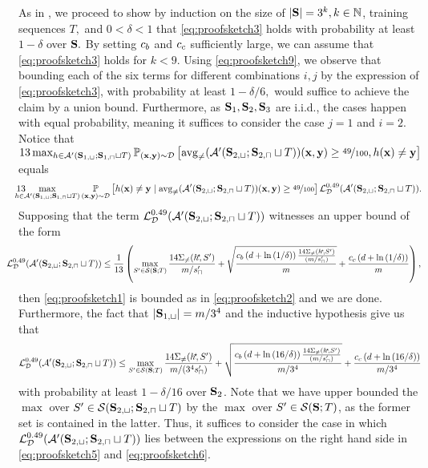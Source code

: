 As in \cite{hanneke2016optimal}, we proceed to show by induction on the size of $|\mathbf{S}|=3^{k}, k\in\mathbb{N} $, training sequences $T, $ and $ 0< \delta<1$ that \cref{eq:proofsketch3} holds with probability at least $ 1-\delta $ over $ \mathbf{S}. $  
By setting $ c_b $ and $ c_c $ sufficiently large, we can assume that \cref{eq:proofsketch3} holds for $k < 9$.
Using \cref{eq:proofsketch9}, we observe that
bounding each of the six terms for different combinations $ i,j $ by the expression of \cref{eq:proofsketch3}, with probability at least $ 1-\delta/6,$ would suffice to achieve the claim by a union bound.
Furthermore, as $ \mathbf{S}_{1},\mathbf{S}_{2},\mathbf{S}_{3} $ are i.i.d., the cases happen with equal probability, meaning it suffices to consider the case $ j=1$ and $ i=2.$ 
Notice that $13\max_{h\in\mathcal{A}'(\mathbf{S}_{1,\sqcup};\mathbf{S}_{1,\sqcap}\sqcup T)} \operatorname*{\mathbb{P}}_{(\mathbf{x},\mathbf{y})\sim\mathcal{D}}\left[\operatorname{\mathrm{avg}_{\not=}}(\mathcal{A}'(\mathbf{S}_{2,\sqcup};\mathbf{S}_{2,\sqcap}\sqcup T))(\mathbf{x},\mathbf{y})\geq \nicefrac{49}{100},h(\mathbf{x})\not=\mathbf{y}\right] $ equals 
\begin{align}\label{eq:proofsketch1}
\hspace{-0.1 cm}
13\negmedspace\negmedspace\negmedspace\negmedspace\negmedspace\negmedspace\max_{h\in\cA'(\rS_{1,\sqcup};\rS_{1,\sqcap}\sqcup T)}\p_{(\rx,\ry)\sim\cD}\left[h(\rx)\not=\ry\mid \avg(\cA'(\rS_{2,\sqcup};\rS_{2,\sqcap}\sqcup T))(\rx,\ry)\geq \nicefrac{49}{100}\right]\ls_{\cD}^{0.49}(\cA'(\rS_{2,\sqcup};\rS_{2,\sqcap}\sqcup T)). 
\end{align} 
Supposing that the term $ \operatorname{\mathcal{L}}_{\mathcal{D}}^{0.49}(\mathcal{A}'(\mathbf{S}_{2,\sqcup};\mathbf{S}_{2,\sqcap}\sqcup T)) $ witnesses an upper bound of the form
\begin{align}\label{eq:proofsketch5}
\hspace{-0.5 cm}
\ls_{\cD}^{0.49}(\cA'(\rS_{2,\sqcup};\rS_{2,\sqcap}\sqcup T)) \leq \frac{1}{13}\left(\max\limits_{S'\in\cS(\rS;T)}\frac{14\Sigma_{\not=}(\hs\negmedspace,S')}{m/s_{\sqcap}'}+\sqrt{\frac{\cb\left(d+\ln{(1/\delta )}\right)\frac{14\Sigma_{\not=}(\hs\negmedspace,S')}{(m/s_{\sqcap}')}}{m}}+\frac{\cc\left(d+\ln{(1/\delta )}\right)}{m}\right),
\end{align}
then \cref{eq:proofsketch1} is bounded as in \cref{eq:proofsketch2} and we are done. 
Furthermore, the fact that $ |\mathbf{S}_{1,\sqcup}|=m/3^{4} $ and the inductive hypothesis give us that
\begin{align}\label{eq:proofsketch6}
    \operatorname{\mathcal{L}}_{\mathcal{D}}^{0.49}(\mathcal{A}'(\mathbf{S}_{2,\sqcup};\mathbf{S}_{2,\sqcap}\sqcup T)) \leq \max\limits_{S'\in\mathcal{S}(\mathbf{S};T)}\frac{14\Sigma_{\not=}(h^{\negmedspace\star}\negmedspace,S')}{m/(3^{4}s_{\sqcap}')}+\sqrt{\frac{c_b\left(d+\ln{(16/\delta )}\right)\frac{14\Sigma_{\not=}(h^{\negmedspace\star}\negmedspace,S')}{(m/s_{\sqcap}')}}{m/3^{4}}}+\frac{c_c\left(d+\ln{(16/\delta )}\right)}{m/3^{4}}
\end{align} 
with probability at least $ 1-\delta/16 $ over $ \mathbf{S}_{2}$. Note that we have upper bounded the $ \max$ over ${S'\in\mathcal{S}(\mathbf{S}_{2,\sqcup};\mathbf{S}_{2,\sqcap}\sqcup T)} $ by the $ \max$ over ${S'\in\mathcal{S}(\mathbf{S};T)} $, as the former set is contained in the latter.   
Thus, it suffices to consider the case in which $ \operatorname{\mathcal{L}}_{\mathcal{D}}^{0.49}(\mathcal{A}'(\mathbf{S}_{2,\sqcup};\mathbf{S}_{2,\sqcap}\sqcup T)) $ lies between the expressions on the right hand side in \cref{eq:proofsketch5} and \cref{eq:proofsketch6}. 

